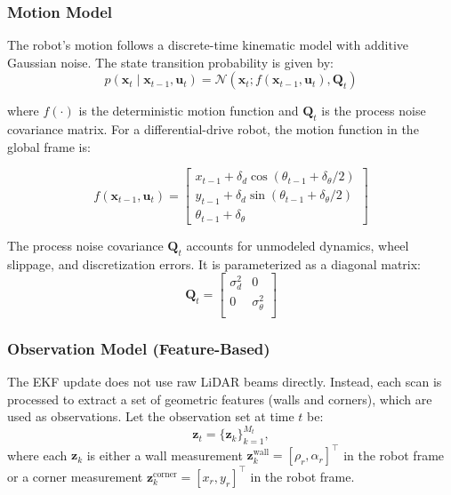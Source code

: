 \documentclass[11pt]{article}
\begin{document}
\subsubsection{Motion Model}

The robot's motion follows a discrete-time kinematic model with additive Gaussian noise. The state transition probability is given by:
\begin{equation}
	p(\mathbf{x}_t \mid \mathbf{x}_{t-1}, \mathbf{u}_t) = \mathcal{N}(\mathbf{x}_t; f(\mathbf{x}_{t-1}, \mathbf{u}_t), \mathbf{Q}_t)
\end{equation}

where $f(\cdot)$ is the deterministic motion function and $\mathbf{Q}_t$ is the process noise covariance matrix. For a differential-drive robot, the motion function in the global frame is:

\[
f(\mathbf{x}_{t-1}, \mathbf{u}_t) 
=
\begin{bmatrix}
	x_{t-1} + \delta_d \cos(\theta_{t-1} + \delta_\theta / 2) \\
	y_{t-1}  + \delta_d \sin(\theta_{t-1} + \delta_\theta / 2) \\
	\theta_{t-1} + \delta_\theta
\end{bmatrix}
\]

The process noise covariance $\mathbf{Q}_t$ accounts for unmodeled dynamics, wheel slippage, and discretization errors. It is parameterized as a diagonal matrix:
\begin{equation}
	\mathbf{Q}_t = \begin{bmatrix}
		\sigma_d^2 & 0 \\
		0 & \sigma_\theta^2\\
	\end{bmatrix}
\end{equation}


\subsubsection{Observation Model (Feature-Based)}
The EKF update does not use raw LiDAR beams directly. Instead, each scan is processed to extract a set of geometric features (walls and corners), which are used as observations. Let the observation set at time $t$ be:
\begin{equation}
	\mathbf{z}_t = \{ \mathbf{z}_k \}_{k=1}^{M_t},
\end{equation}
where each $\mathbf{z}_k$ is either a wall measurement $\mathbf{z}_k^{\text{wall}} = [\rho_r, \alpha_r]^\top$ in the robot frame or a corner measurement $\mathbf{z}_k^{\text{corner}} = [x_r, y_r]^\top$ in the robot frame.
\end{document}
